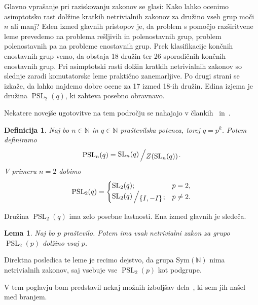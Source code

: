 \documentclass[12pt,a4paper]{article}
\newcounter{theoremcounter}[section] %
\newtheorem{lema}[theoremcounter]{Lema}
\newtheorem{definicija}[theoremcounter]{Definicija}
\newcommand{\quot}[2]{{\raisebox{0.1em}{$#1$}\left/\raisebox{-0.2em}{$#2$}\right.}}
\begin{document}
Glavno vprašanje pri raziskovanju zakonov se glasi: Kako lahko ocenimo asimptotsko rast dolžine kratkih netrivialnih zakonov za družino vseh grup moči $n$ ali manj?
Eden izmed glavnih pristopov je, da problem s pomočjo razširitvene leme prevedemo na problema rešljivih in polenostavnih grup, problem polenostavnih pa na probleme enostavnih grup.
Prek klasifikacije končnih enostavnih grup vemo, da obstaja 18 družin ter 26 sporadičnih končnih enostavnih grup. Pri asimptotski rasti dolžin kratkih netrivialnih zakonov so slednje zaradi komutatorske leme praktično zanemarljive. Po drugi strani se izkaže, da lahko najdemo dobre ocene za 17 izmed 18-ih družin.
Edina izjema je družina $\operatorname{PSL}_2(q)$, ki zahteva posebno obravnavo.

\noindent
Nekatere novejše ugotovitve na tem področju se nahajajo v člankih~\cite{Bradford_Thom_2022} in~\cite{Bradford_Jakob_Schneider_Thom_2023}.
\begin{definicija}
Naj bo $n \in \mathbb{N}$ in $q \in \mathbb{N}$ praštevilska potenca, torej $q = p^{k}$. Potem definiramo \begin{equation*}
    \operatorname{PSL}_n(q) = \quot{\operatorname{SL}_n(q)}{Z(\operatorname{SL}_n(q))}.
 \end{equation*}   
V primeru $n = 2$ dobimo
\begin{equation*}
            \operatorname{PSL}_2(q) = \begin{cases}
                \operatorname{SL}_2(q); & p = 2,  \\
                \quot{\operatorname{SL}_2(q)}{\left\{ I, -I \right\} }; & p \neq 2.
            \end{cases}
         \end{equation*}   
\end{definicija}
\noindent
Družina $\operatorname{PSL}_2(q)$ ima zelo posebne lastnosti. Ena izmed glavnih je sledeča. 
\begin{lema}
Naj bo $p$ praštevilo. Potem ima vsak netrivialni zakon za grupo $\operatorname{PSL}_2(p)$ dolžino vsaj $p$.
\end{lema}
\noindent
Direktna posledica te leme je recimo dejstvo, da grupa $\text{Sym}(\mathbb{N})$ nima
netrivialnih zakonov, saj vsebuje vse $\operatorname{PSL}_2(p)$ kot podgrupe.


\noindent
V tem poglavju bom predstavil nekaj možnih izboljšav dela~\cite{Schneider_2016}, ki sem jih našel med branjem.
\end{document}
